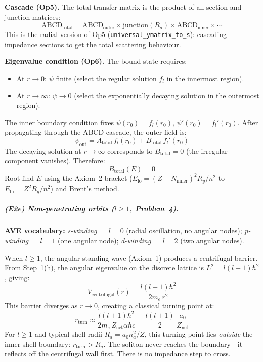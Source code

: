 \noindent\textbf{Cascade (Op5).}
The total transfer matrix is the product of all
section and junction matrices:
\begin{equation}
    \text{ABCD}_{\text{total}} =
    \text{ABCD}_{\text{outer}} \times
    \text{junction}(R_a) \times
    \text{ABCD}_{\text{inner}} \times \cdots
    \label{eq:abcd_cascade}
\end{equation}
This is the radial version of Op5
(\texttt{universal\_ymatrix\_to\_s}): cascading
impedance sections to get the total scattering
behaviour.

\noindent\textbf{Eigenvalue condition (Op6).}
The bound state requires:
\begin{itemize}
    \item At $r \to 0$: $\psi$ finite
          (select the regular solution $f_l$
          in the innermost region).
    \item At $r \to \infty$: $\psi \to 0$
          (select the exponentially decaying
          solution in the outermost region).
\end{itemize}
The inner boundary condition fixes $\psi(r_0)
= f_l(r_0)$, $\psi'(r_0) = f_l'(r_0)$.  After
propagating through the ABCD cascade, the outer
field is:
\[
    \psi_{\text{out}} = A_{\text{total}}\,f_l(r_0)
    + B_{\text{total}}\,f_l'(r_0)
\]
The decaying solution at $r \to \infty$
corresponds to $B_{\text{total}} = 0$
(the irregular component vanishes).  Therefore:
\begin{equation}
    \boxed{B_{\text{total}}(E) = 0}
    \label{eq:abcd_eigenvalue}
\end{equation}
Root-find $E$ using the Axiom~2 bracket
($E_{\text{lo}} = (Z-N_{\text{inner}})^2 R_y/n^2$
to $E_{\text{hi}} = Z^2 R_y/n^2$) and Brent's
method.

\subparagraph{(E2e) Non-penetrating orbits
($l \geq 1$, Problem~4).}

\noindent\textbf{AVE vocabulary:}
\emph{s-winding} $= l{=}0$ (radial oscillation,
no angular nodes); \emph{p-winding} $= l{=}1$
(one angular node); \emph{d-winding} $= l{=}2$
(two angular nodes).

When $l \geq 1$, the angular standing wave
(Axiom~1) produces a centrifugal barrier.  From
Step~1(h), the angular eigenvalue on the discrete
lattice is $L^2 = l(l+1)\hbar^2$, giving:
\begin{equation}
    V_{\text{centrifugal}}(r) =
    \frac{l(l+1)\hbar^2}{2m_e\,r^2}
    \label{eq:centrifugal_barrier}
\end{equation}
This barrier diverges as $r \to 0$, creating a
classical turning point at:
\begin{equation}
    r_{\text{turn}} \approx
    \frac{l(l+1)\hbar^2}{2m_e\,
    Z_{\text{net}}\alpha\hbar c}
    = \frac{l(l+1)}{2}\,\frac{a_0}{Z_{\text{net}}}
    \label{eq:centrifugal_turning}
\end{equation}
For $l \geq 1$ and typical shell radii
$R_a = a_0 n_a^2 / Z$, this turning point lies
\emph{outside} the inner shell boundary:
$r_{\text{turn}} > R_a$.  The soliton never
reaches the boundary---it reflects off the
centrifugal wall first.  There is no impedance step
to cross.

